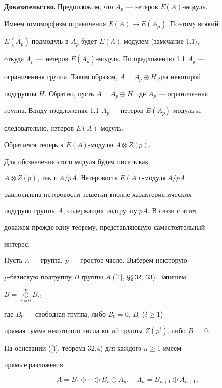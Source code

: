  


{\bf Доказательство.} Предположим, что $A_p$ --- нетеров $E(A)$-модуль. 


Имеем гомоморфизм ограничения $E(A)\to E(A_p)$. Поэтому всякий 


$E(A_p)$-подмодуль в $A_p$ будет $E(A)$-модулем (замечание 1.1),


oткуда $A_p$ --- нетеров $E(A_p)$-модуль. По предложению 1.1\; $A_p$ --- 


ограниченная группа. Таким образом, $A=A_p\oplus H$ для некоторой 


подгруппы $H$. Обратно, пусть $A=A_p\oplus H$, где $A_p$ --- ограниченная 


группа. Ввиду предложения 1.1\; $A_p$ --- нетеров $E(A_p)$-модуль и, 


следовательно, нетеров $E(A)$-модуль. 


 


Обратимся теперь к $E(A)$-модулю $A\otimes Z(p)$.


Для обозначения этого модуля будем писать как 


$A\otimes Z(p)$, так и $A/pA$. Нетеровость $E(A)$-модуля $A/pA$ 


равносильна нетеровости решетки вполне характеристических 


подгрупп группы $A$, содержащих подгруппу $pA$. В связи с этим 


докажем прежде одну теорему, представляющую самостоятельный 


интерес. 


 


Пусть $A$ --- группа, $p$ --- простое число. Выберем некоторую 


$p$-базисную подгруппу $B$ группы $A$ ([1], \S\S\,32, 33). Запишем 


$B=\mathop{\oplus}\limits^\infty_{i=0}B_i$, 


где $B_0$ --- свободная группа, либо $B_0=0$, $B_i$ ($i\ge1$) --- 


прямая сумма некоторого числа копий группы $Z(p^i)$, либо $B_i=0$. 


На основании ([1], теорема 32.4) для каждого $n\ge1$ имеем 


прямые разложения 


\begin{equation} 


A=B_1\oplus\dotsb\oplus B_n\oplus A_n,\quad 


A_n=B_{n+1}\oplus A_{n+1}, 


\end{equation} 



